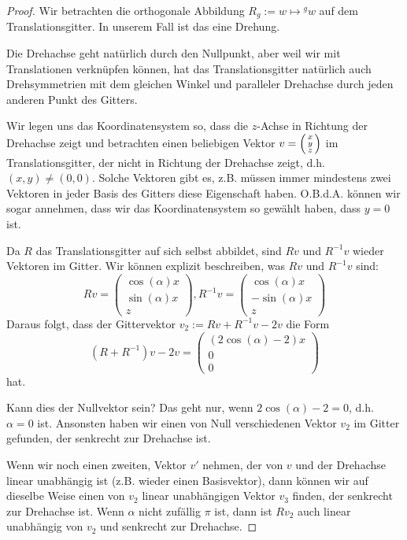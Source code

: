 \begin{proof}
Wir betrachten die orthogonale Abbildung $R_g:=w\mapsto{^g w}$ auf dem Translationsgitter. In unserem Fall ist das eine Drehung.

Die Drehachse geht natürlich durch den Nullpunkt, aber weil wir mit Translationen verknüpfen können, hat das Translationsgitter natürlich auch Drehsymmetrien mit  dem gleichen Winkel und paralleler Drehachse durch jeden anderen Punkt des Gitters.

Wir legen uns das Koordinatensystem so, dass die $z$-Achse in Richtung der Drehachse zeigt und betrachten einen beliebigen Vektor $v=\begin{psmallmatrix}x\\y\\z\end{psmallmatrix}$ im Translationsgitter, der nicht in Richtung der Drehachse zeigt, d.h. $(x,y)\neq(0,0)$. Solche Vektoren gibt es, z.B. müssen immer mindestens zwei Vektoren in jeder Basis des Gitters diese Eigenschaft haben. O.B.d.A. können wir sogar annehmen, dass wir das Koordinatensystem so gewählt haben, dass $y=0$ ist.

\medbreak
Da $R$ das Translationsgitter auf sich selbst abbildet, sind $Rv$ und $R^{-1}v$ wieder Vektoren im Gitter. Wir können explizit beschreiben, was $Rv$ und $R^{-1}v$ sind:
\[Rv =\begin{pmatrix}\cos(\alpha)x\\\sin(\alpha)x\\z\end{pmatrix}, R^{-1}v =\begin{pmatrix}\cos(\alpha)x\\-\sin(\alpha)x\\z\end{pmatrix}\]
Daraus folgt, dass der Gittervektor $v_2:=Rv+R^{-1}v-2v$ die Form
\[(R+R^{-1})v-2v = \begin{pmatrix}(2\cos(\alpha)-2)x\\0\\0\end{pmatrix}\]
hat.

Kann dies der Nullvektor sein? Das geht nur, wenn $2\cos(\alpha)-2=0$, d.h. $\alpha=0$ ist. Ansonsten haben wir einen von Null verschiedenen Vektor $v_2$ im Gitter gefunden, der senkrecht zur Drehachse ist.

Wenn wir noch einen zweiten, Vektor $v'$ nehmen, der von $v$ und der Drehachse linear unabhängig ist (z.B. wieder einen Basisvektor), dann können wir auf dieselbe Weise einen von $v_2$ linear unabhängigen Vektor $v_3$ finden, der senkrecht zur Drehachse ist. Wenn $\alpha$ nicht zufällig $\pi$ ist, dann ist $Rv_2$ auch linear unabhängig von $v_2$ und senkrecht zur Drehachse.


\end{proof}
